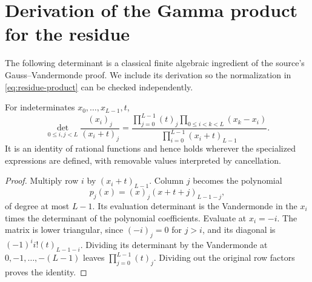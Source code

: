 \section{Derivation of the Gamma product for the residue}
\label{app:product}

The following determinant is a classical finite algebraic ingredient of
the source's Gauss--Vandermonde proof. We include its derivation so the
normalization in \eqref{eq:residue-product} can be checked independently.

\begin{lemma}\label{lem:factorial-det}
For indeterminates $x_0,\ldots,x_{L-1},t$,
\begin{equation}\label{eq:factorial-det}
 \det_{0\le i,j<L}\frac{(x_i)_j}{(x_i+t)_j}
 =\frac{\displaystyle\prod_{j=0}^{L-1}(t)_j
             \prod_{0\le i<k<L}(x_k-x_i)}
        {\displaystyle\prod_{i=0}^{L-1}(x_i+t)_{L-1}}.
\end{equation}
It is an identity of rational functions and hence holds wherever the
specialized expressions are defined, with removable values interpreted
by cancellation.
\end{lemma}
\begin{proof}
Multiply row $i$ by $(x_i+t)_{L-1}$. Column $j$ becomes the polynomial
\[
 p_j(x)=(x)_j(x+t+j)_{L-1-j},
\]
of degree at most $L-1$. Its evaluation determinant is the Vandermonde
in the $x_i$ times the determinant of the polynomial coefficients.
Evaluate at $x_i=-i$. The matrix is lower triangular, since $(-i)_j=0$
for $j>i$, and its diagonal is
$(-1)^ii!(t)_{L-1-i}$. Dividing its determinant by the Vandermonde
at $0,-1,\ldots,-(L-1)$ leaves $\prod_{j=0}^{L-1}(t)_j$.
Dividing out the original row factors proves the identity.
\end{proof}

